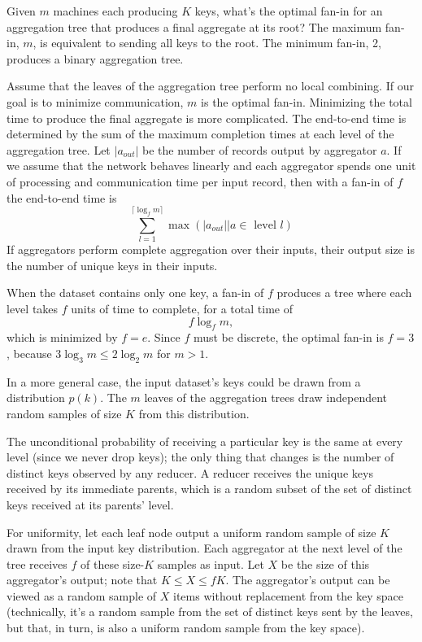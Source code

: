 \documentclass[12pt]{article}
\begin{document}
Given $m$ machines each producing $K$ keys, what's the optimal fan-in for an
aggregation tree that produces a final aggregate at its root?  The maximum
fan-in, $m$, is equivalent to sending all keys to the root.  The minimum
fan-in, 2, produces a binary aggregation tree.

Assume that the leaves of the aggregation tree perform no local combining.
If our goal is to minimize communication, $m$ is the optimal fan-in.
Minimizing the total time to produce the final aggregate is more complicated.
The end-to-end time is determined by the sum of the maximum completion times
at each level of the aggregation tree.  Let $|a_{out}|$ be the number of
records output by aggregator $a$.  If we assume that the network behaves
linearly and each aggregator spends one unit of processing and communication
time per input record, then with a fan-in of $f$ the end-to-end time is
\[
    \sum_{l=1}^{\lceil\log_fm\rceil}
        \max
        \left(
            |a_{out}| | a \in \text{ level } l
        \right)
\]
If aggregators perform complete aggregation over their inputs, their output
size is the number of unique keys in their inputs.

When the dataset contains only one key, a fan-in of $f$ produces a tree
where each level takes $f$ units of time to complete, for a total time of
\[
    f \log_f m,
\]
which is minimized by $f = e$.  Since $f$ must be discrete, the optimal fan-in
is $f = 3$, because $3 \log_3 m \leq 2 \log_2 m$ for $m > 1$.

In a more general case, the input dataset's keys could be drawn from
a distribution $p(k)$.  The $m$ leaves of the aggregation trees draw
independent random samples of size $K$ from this distribution.

The unconditional probability of receiving
a particular key is the same at every level (since we never drop keys); the
only thing that changes is the number of distinct keys observed by any
reducer.  A reducer receives the unique keys received by its immediate
parents, which is a random subset of the set of distinct keys received at its
parents' level.

For uniformity, let each leaf node output a uniform random sample of size
$K$ drawn from the input key distribution.  Each aggregator at the next
level of the tree receives $f$ of these size-$K$ samples as input.  Let $X$ be the size
of this aggregator's output; note that $K \leq X \leq fK$.  The aggregator's
output can be viewed as a random sample of $X$ items without replacement from
the key space (technically, it's a random sample from the set of distinct keys
sent by the leaves, but that, in turn, is also a uniform random sample from the
key space).
\end{document}
